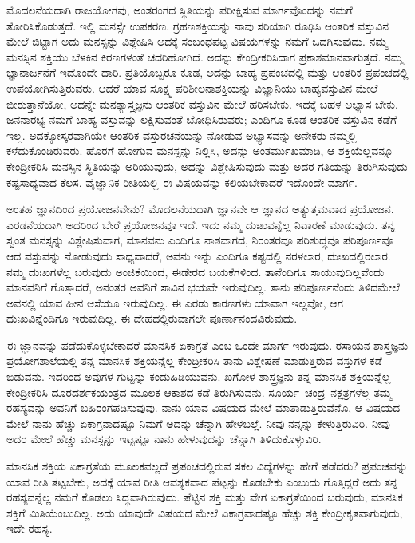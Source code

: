 ಮೊದಲನೆಯದಾಗಿ ರಾಜಯೋಗವು, ಅಂತರಂಗದ ಸ್ಥಿತಿಯನ್ನು ಪರೀಕ್ಷಿಸುವ ಮಾರ್ಗವೊಂದನ್ನು ನಮಗೆ ತೋರಿಸಿಕೊಡುತ್ತದೆ. ಇಲ್ಲಿ ಮನಸ್ಸೇ ಉಪಕರಣ. ಗ್ರಹಣಶಕ್ತಿಯನ್ನು ನಾವು ಸರಿಯಾಗಿ ರೂಢಿಸಿ ಆಂತರಿಕ ವಸ್ತುವಿನ ಮೇಲೆ ಬಿಟ್ಟಾಗ ಅದು ಮನಸ್ಸನ್ನು ವಿಶ್ಲೇಷಿಸಿ ಅದಕ್ಕೆ ಸಂಬಂಧಪಟ್ಟ ವಿಷಯಗಳನ್ನು ನಮಗೆ ಒದಗಿಸುವುದು. ನಮ್ಮ ಮನಸ್ಸಿನ ಶಕ್ತಿಯು ಬೆಳಕಿನ ಕಿರಣಗಳಂತೆ ಚದರಿಹೋಗಿದೆ. ಅದನ್ನು ಕೇಂದ್ರೀಕರಿಸಿದಾಗ ಪ್ರಕಾಶಮಾನವಾಗುತ್ತದೆ. ನಮ್ಮ ಜ್ಞಾನಾರ್ಜನೆಗೆ ಇದೊಂದೇ ದಾರಿ. ಪ್ರತಿಯೊಬ್ಬರೂ ಕೂಡ, ಅದನ್ನು ಬಾಹ್ಯ ಪ್ರಪಂಚದಲ್ಲಿ ಮತ್ತು ಆಂತರಿಕ ಪ್ರಪಂಚದಲ್ಲಿ ಉಪಯೋಗಿಸುತ್ತಿರುವರು. ಆದರೆ ಯಾವ ಸೂಕ್ಷ್ಮ ಪರಿಶೀಲನಾಶಕ್ತಿಯನ್ನು ವಿಜ್ಞಾನಿಯು ಬಾಹ್ಯವಸ್ತುವಿನ ಮೇಲೆ ಬೀರುತ್ತಾನೆಯೋ, ಅದನ್ನೇ ಮನಶ್ಯಾಸ್ತ್ರಜ್ಞನು ಆಂತರಿಕ ವಸ್ತುವಿನ ಮೇಲೆ ಹರಿಸಬೇಕು. ಇದಕ್ಕೆ ಬಹಳ ಅಭ್ಯಾಸ ಬೇಕು. ಜನನಾರಭ್ಯ ನಮಗೆ ಬಾಹ್ಯ ವಸ್ತುವನ್ನು ಲಕ್ಷಿಸುವಂತೆ ಬೋಧಿಸಿರುವರು; ಎಂದಿಗೂ ಕೂಡ ಆಂತರಿಕ ವಸ್ತುವಿನ ಕಡೆಗೆ ಇಲ್ಲ. ಅದಕ್ಕೋಸ್ಕರವಾಗಿಯೇ ಆಂತರಿಕ ವಸ್ತುರಚನೆಯನ್ನು ನೋಡುವ ಅಭ್ಯಾಸವನ್ನು ಅನೇಕರು ನಮ್ಮಲ್ಲಿ ಕಳೆದುಕೊಂಡಿರುವರು. ಹೊರಗೆ ಹೋಗುವ ಮನಸ್ಸನ್ನು ನಿಲ್ಲಿಸಿ, ಅದನ್ನು ಅಂತರ್ಮುಖಮಾಡಿ, ಆ ಶಕ್ತಿಯೆಲ್ಲವನ್ನೂ ಕೇಂದ್ರೀಕರಿಸಿ ಮನಸ್ಸಿನ ಸ್ಥಿತಿಯನ್ನು ಅರಿಯುವುದು, ಅದನ್ನು ವಿಶ್ಲೇಷಿಸುವುದು ಮತ್ತು ಅದರ ಗತಿಯನ್ನು ತಿರುಗಿಸುವುದು ಕಷ್ಟಸಾಧ್ಯವಾದ ಕೆಲಸ. ವೈಜ್ಞಾನಿಕ ರೀತಿಯಲ್ಲಿ ಈ ವಿಷಯವನ್ನು ಕಲಿಯಬೇಕಾದರೆ ಇದೊಂದೇ ಮಾರ್ಗ. 

\vskip 5pt

ಅಂತಹ ಜ್ಞಾನದಿಂದ ಪ್ರಯೋಜನವೇನು? ಮೊದಲನೆಯದಾಗಿ ಜ್ಞಾನವೇ ಆ ಜ್ಞಾನದ ಅತ್ಯುತ್ತಮವಾದ ಪ್ರಯೋಜನ. ಎರಡನೆಯದಾಗಿ ಅದರಿಂದ ಬೇರೆ ಪ್ರಯೋಜನವೂ ಇದೆ. ಇದು ನಮ್ಮ ದುಃಖವನ್ನೆಲ್ಲ ನಿವಾರಣೆ ಮಾಡುವುದು. ತನ್ನ ಸ್ವಂತ ಮನಸ್ಸನ್ನು ವಿಶ್ಲೇಷಿಸುವಾಗ, ಮಾನವನು ಎಂದಿಗೂ ನಾಶವಾಗದ, ನಿರಂತರವೂ ಪರಿಶುದ್ಧವೂ ಪರಿಪೂರ್ಣವೂ ಆದ ವಸ್ತುವನ್ನು ನೋಡುವುದು ಸಾಧ್ಯವಾದರೆ, ಅವನು ಇನ್ನು ಎಂದಿಗೂ ಕಷ್ಟದಲ್ಲಿ ನರಳಲಾರ, ದುಃಖದಲ್ಲಿರಲಾರ. ನಮ್ಮ ದುಃಖಗಳೆಲ್ಲ ಬರುವುದು ಅಂಜಿಕೆಯಿಂದ, ಈಡೇರದ ಬಯಕೆಗಳಿಂದ. ತಾನೆಂದಿಗೂ ಸಾಯುವುದಿಲ್ಲವೆಂದು ಮಾನವನಿಗೆ ಗೊತ್ತಾದರೆ, ಅನಂತರ ಅವನಿಗೆ ಸಾವಿನ ಭಯವೇ ಇರುವುದಿಲ್ಲ. ತಾನು ಪರಿಪೂರ್ಣನೆಂದು ತಿಳಿದಮೇಲೆ ಅವನಲ್ಲಿ ಯಾವ ಹೀನ ಆಸೆಯೂ ಇರುವುದಿಲ್ಲ. ಈ ಎರಡು ಕಾರಣಗಳು ಯಾವಾಗ ಇಲ್ಲವೋ, ಆಗ ದುಃಖವಿನ್ನೆಂದಿಗೂ ಇರುವುದಿಲ್ಲ. ಈ ದೇಹದಲ್ಲಿರುವಾಗಲೇ ಪೂರ್ಣಾನಂದವಿರುವುದು. 

ಈ ಜ್ಞಾನವನ್ನು ಪಡೆದುಕೊಳ್ಳಬೇಕಾದರೆ ಮಾನಸಿಕ ಏಕಾಗ್ರತೆ ಎಂಬ ಒಂದೇ ಮಾರ್ಗ ಇರುವುದು. ರಸಾಯನ ಶಾಸ್ತ್ರಜ್ಞನು ಪ್ರಯೋಗಶಾಲೆಯಲ್ಲಿ ತನ್ನ ಮಾನಸಿಕ ಶಕ್ತಿಯನ್ನೆಲ್ಲ ಕೇಂದ್ರೀಕರಿಸಿ ತಾನು ವಿಶ್ಲೇಷಣೆ ಮಾಡುತ್ತಿರುವ ವಸ್ತುಗಳ ಕಡೆ ಬಿಡುವನು. ಇದರಿಂದ ಅವುಗಳ ಗುಟ್ಟನ್ನು ಕಂಡುಹಿಡಿಯುವನು. ಖಗೋಳ ಶಾಸ್ತ್ರಜ್ಞನು ತನ್ನ ಮಾನಸಿಕ ಶಕ್ತಿಯನ್ನೆಲ್ಲ ಕೇಂದ್ರೀಕರಿಸಿ ದೂರದರ್ಶಕಯಂತ್ರದ ಮೂಲಕ ಆಕಾಶದ ಕಡೆ ತಿರುಗಿಸುವನು. ಸೂರ್ಯ–ಚಂದ್ರ–ನಕ್ಷತ್ರಗಳೆಲ್ಲ ತಮ್ಮ ರಹಸ್ಯವನ್ನು ಅವನಿಗೆ ಬಹಿರಂಗಪಡಿಸುವುವು. ನಾನು ಯಾವ ವಿಷಯದ ಮೇಲೆ ಮಾತಾಡುತ್ತಿರುವೆನೊ, ಆ ವಿಷಯದ ಮೇಲೆ ನಾನು ಹೆಚ್ಚು ಏಕಾಗ್ರನಾದಷ್ಟೂ ನಿಮಗೆ ಅದನ್ನು ಚೆನ್ನಾಗಿ ಹೇಳಬಲ್ಲೆ. ನೀವು ನನ್ನನ್ನು ಕೇಳುತ್ತಿರುವಿರಿ. ನೀವು ಅದರ ಮೇಲೆ ಹೆಚ್ಚು ಮನಸ್ಸನ್ನು ಇಟ್ಟಷ್ಟೂ ನಾನು ಹೇಳುವುದನ್ನು ಚೆನ್ನಾಗಿ ತಿಳಿದುಕೊಳ್ಳುವಿರಿ. 

ಮಾನಸಿಕ ಶಕ್ತಿಯ ಏಕಾಗ್ರತೆಯ ಮೂಲಕವಲ್ಲದೆ ಪ್ರಪಂಚದಲ್ಲಿರುವ ಸಕಲ ವಿದ್ಯೆಗಳನ್ನು ಹೇಗೆ ಪಡೆದರು? ಪ್ರಪಂಚವನ್ನು ಯಾವ ರೀತಿ ತಟ್ಟಬೇಕು, ಅದಕ್ಕೆ ಯಾವ ರೀತಿ ಆವಶ್ಯಕವಾದ ಪೆಟ್ಟನ್ನು ಕೊಡಬೇಕು ಎಂಬುದು ಗೊತ್ತಿದ್ದರೆ ಅದು ತನ್ನ ರಹಸ್ಯವನ್ನೆಲ್ಲ ನಮಗೆ ಕೊಡಲು ಸಿದ್ಧವಾಗಿರುವುದು. ಪೆಟ್ಟಿನ ಶಕ್ತಿ ಮತ್ತು ವೇಗ ಏಕಾಗ್ರತೆಯಿಂದ ಬರುವುದು, ಮಾನಸಿಕ ಶಕ್ತಿಗೆ ಮಿತಿಯೆಂಬುದಿಲ್ಲ. ಅದು ಯಾವುದೇ ವಿಷಯದ ಮೇಲೆ ಏಕಾಗ್ರವಾದಷ್ಟೂ ಹೆಚ್ಚು ಶಕ್ತಿ ಕೇಂದ್ರೀಕೃತವಾಗುವುದು, ಇದೇ ರಹಸ್ಯ. 

